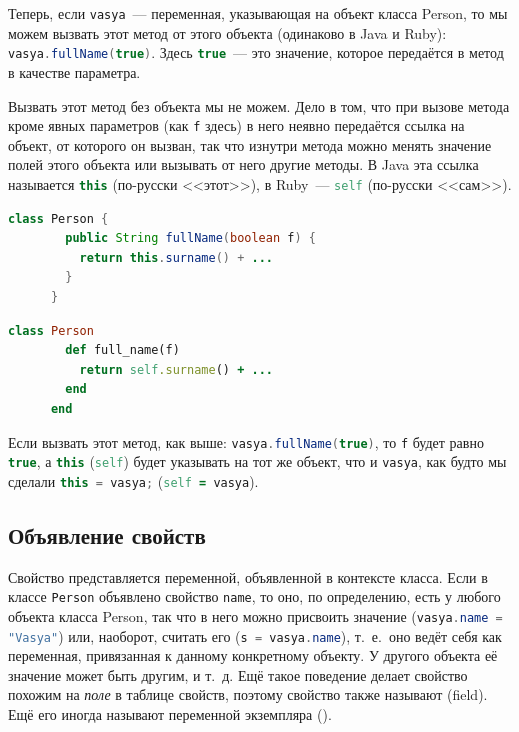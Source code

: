 \documentclass[a4paper, 14pt, titlepage]{extarticle}
\newcommand{\eng}[1]{{\English #1}}
\newcommand{\define}[1]{\uwave{#1}}
\newcommand{\ie}{т.~е.~}
\newenvironment{halfpage}%
    {\noindent\begin{minipage}[h]{0.49\linewidth}} %
    {\end{minipage}\hfill}
\newcommand{\inlinecode}[2][Java]{\lstinline[basicstyle=\ttfamily, language=#1]{#2}}
\begin{document}
  Теперь, если \inlinecode{vasya}~--- переменная, указывающая на объект класса Person, то мы можем
  вызвать этот метод от этого объекта (одинаково в Java и Ruby): \inlinecode{vasya.fullName(true)}.
  Здесь \inlinecode{true}~--- это значение, которое передаётся в метод в качестве параметра.

  Вызвать этот метод без объекта мы не можем. Дело в том, что при вызове метода кроме явных
  параметров (как \inlinecode{f} здесь) в него неявно передаётся ссылка на объект, от которого он
  вызван, так что изнутри метода можно менять значение полей этого объекта или вызывать от него
  другие методы. В Java эта ссылка называется \inlinecode[Java]{this} (по-русски <<этот>>), в
  Ruby~--- \inlinecode[Ruby]{self} (по-русски <<сам>>).

  \begin{halfpage}
    \begin{lstlisting}[language=Java, title={Метод в Java}, gobble=6, texcl]
      class Person {
        public String fullName(boolean f) {
          return this.surname() + ...
        }
      }
    \end{lstlisting}
  \end{halfpage}
  \begin{halfpage}
    \begin{lstlisting}[language=Ruby, title={Метод в Ruby}, gobble=6, texcl]
      class Person
        def full_name(f)
          return self.surname() + ...
        end
      end
    \end{lstlisting}
  \end{halfpage}

  Если вызвать этот метод, как выше: \inlinecode{vasya.fullName(true)},
  то \inlinecode{f} будет равно \inlinecode{true}, а \inlinecode[Java]{this} (\inlinecode[Ruby]{self})
  будет указывать на тот же объект, что и \inlinecode{vasya}, как будто мы сделали
  \inlinecode[Java]{this = vasya;} (\inlinecode[Ruby]{self = vasya}).

  \subsection{Объявление свойств}

  Свойство представляется переменной, объявленной в контексте класса. Если в классе
  \inlinecode{Person} объявлено свойство \inlinecode{name}, то оно, по определению, есть у любого
  объекта класса Person, так что в него можно присвоить значение (\inlinecode{vasya.name = "Vasya"})
  или, наоборот, считать его (\inlinecode{s = vasya.name}), \ie оно ведёт себя как переменная,
  привязанная к данному конкретному объекту. У другого объекта её значение может быть другим, и
  т.~д. Ещё такое поведение делает свойство похожим на \emph{поле} в таблице свойств, поэтому свойство
  также называют \define{полем} (field). Ещё его иногда называют переменной экземпляра
  (\define{\eng{instance variable}}).
\end{document}
